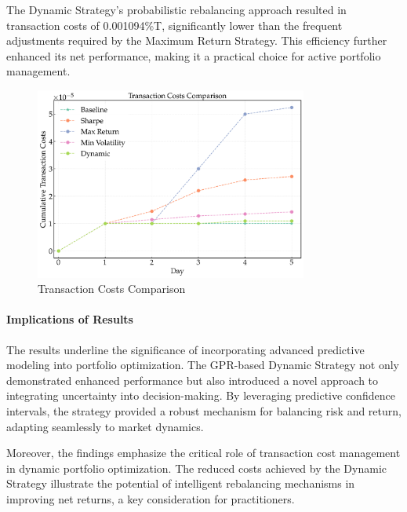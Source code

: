 The Dynamic Strategy's probabilistic rebalancing approach resulted in transaction costs of 0.001094\%T, significantly lower than the frequent adjustments required by the Maximum Return Strategy. 
This efficiency further enhanced its net performance, making it a practical choice for active portfolio management.
\begin{figure}[htbp]
    \centering
    \includegraphics[width=0.8\textwidth]{figures/trx_costs_comparison_final_non.png}
    \caption{Transaction Costs Comparison}
    \label{fig:trx_costs_comparison_non_iterative}
\end{figure}

\paragraph{Implications of Results}

The results underline the significance of incorporating advanced predictive modeling into portfolio optimization. The GPR-based Dynamic Strategy not only demonstrated enhanced performance but also introduced a novel approach to integrating uncertainty into decision-making. By leveraging predictive confidence intervals, the strategy provided a robust mechanism for balancing risk and return, adapting seamlessly to market dynamics.

Moreover, the findings emphasize the critical role of transaction cost management in dynamic portfolio optimization. The reduced costs achieved by the Dynamic Strategy illustrate the potential of intelligent rebalancing mechanisms in improving net returns, a key consideration for practitioners.

